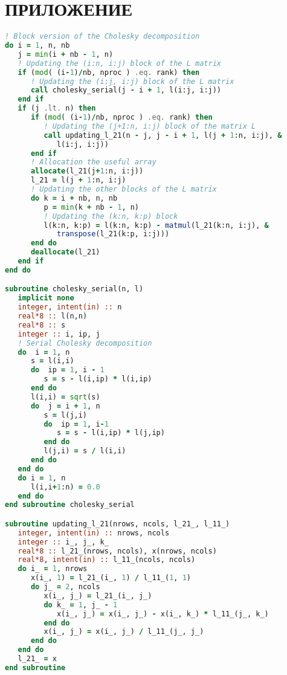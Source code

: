 \section*{ПРИЛОЖЕНИЕ}

\begin{lstlisting}[language=fortran, style=fortran, label={listing:cholesky_serial}, caption={Реализация последовательного блочного алгоритма разложения Холецкого на современном Фортране.}]
! Block version of the Cholesky decomposition
do i = 1, n, nb
   j = min(i + nb - 1, n)
   ! Updating the (i:n, i:j) block of the L matrix
   if (mod( (i-1)/nb, nproc ) .eq. rank) then
      ! Updating the (i:j, i:j) block of the L matrix
      call cholesky_serial(j - i + 1, l(i:j, i:j))
   end if
   if (j .lt. n) then
      if (mod( (i-1)/nb, nproc ) .eq. rank) then
         ! Updating the (j+1:n, i:j) block of the matrix L
         call updating_l_21(n - j, j - i + 1, l(j + 1:n, i:j), &
            l(i:j, i:j))
      end if
      ! Allocation the useful array
      allocate(l_21(j+1:n, i:j))
      l_21 = l(j + 1:n, i:j)
      ! Updating the other blocks of the L matrix
      do k = i + nb, n, nb
         p = min(k + nb - 1, n)
         ! Updating the (k:n, k:p) block
         l(k:n, k:p) = l(k:n, k:p) - matmul(l_21(k:n, i:j), &
            transpose(l_21(k:p, i:j)))
      end do
      deallocate(l_21)
   end if
end do

subroutine cholesky_serial(n, l)
   implicit none
   integer, intent(in) :: n
   real*8 :: l(n,n)
   real*8 :: s
   integer :: i, ip, j
   ! Serial Cholesky decomposition
   do  i = 1, n
      s = l(i,i)
      do  ip = 1, i - 1
         s = s - l(i,ip) * l(i,ip)
      end do
      l(i,i) = sqrt(s)
      do  j = i + 1, n
         s = l(j,i)
         do  ip = 1, i-1
            s = s - l(i,ip) * l(j,ip)
         end do
         l(j,i) = s / l(i,i)
      end do
   end do
   do i = 1, n
      l(i,i+1:n) = 0.0
   end do
end subroutine cholesky_serial

subroutine updating_l_21(nrows, ncols, l_21_, l_11_)
   integer, intent(in) :: nrows, ncols
   integer :: i_, j_, k_
   real*8 :: l_21_(nrows, ncols), x(nrows, ncols)
   real*8, intent(in) :: l_11_(ncols, ncols)
   do i_ = 1, nrows
      x(i_, 1) = l_21_(i_, 1) / l_11_(1, 1)
      do j_ = 2, ncols
         x(i_, j_) = l_21_(i_, j_)
         do k_ = 1, j_ - 1
            x(i_, j_) = x(i_, j_) - x(i_, k_) * l_11_(j_, k_)
         end do
         x(i_, j_) = x(i_, j_) / l_11_(j_, j_)
      end do
   end do
   l_21_ = x
end subroutine
\end{lstlisting}

